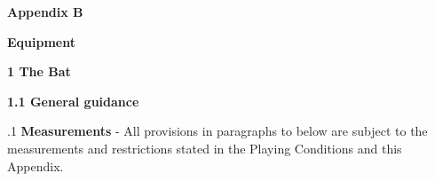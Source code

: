 \documentclass[12pt]{article}
\begin{document}
\vspace{\baselineskip}

\vspace{\baselineskip}

\vspace{\baselineskip}

\vspace{\baselineskip}

\vspace{\baselineskip}

\vspace{\baselineskip}

\vspace{\baselineskip}

\vspace{\baselineskip}
\begin{Center}
{\fontsize{8pt}{9.6pt}\par}
\end{Center}\par


\vspace{\baselineskip}
\begin{Center}
{\fontsize{11pt}{13.2pt}\selectfont \textbf{Appendix B}\par}
\end{Center}\par


\vspace{\baselineskip}
\begin{Center}
{\fontsize{11pt}{13.2pt}\selectfont \textbf{Equipment}\par}
\end{Center}\par


\vspace{\baselineskip}
{\fontsize{16pt}{19.2pt}\selectfont \textbf{1 \tabto{0.47in} The Bat}\par}\par


\vspace{\baselineskip}
{\fontsize{11pt}{13.2pt}\selectfont \textbf{1.1 \tabto{0.47in} General guidance}\par}\par


\vspace{\baselineskip}
\begin{adjustwidth}{0.5in}{0.46in}
{\fontsize{9pt}{10.8pt}.1 \tabto{0.49in} \textbf{Measurements }- All provisions in paragraphs to below are subject to the measurements and restrictions stated in the Playing Conditions and this Appendix.\par}\par

\end{adjustwidth}
\end{document}
